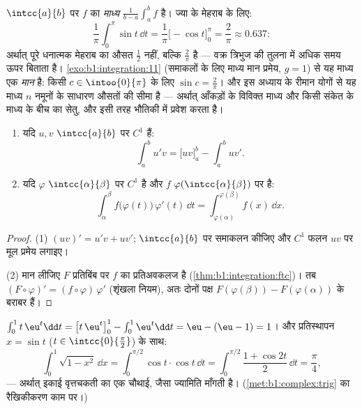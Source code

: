 \begin{example}[औसत मान]\label{ex:b1:integration:average}
$\intcc{a}{b}$ पर  $f$ का \emph{माध्य} $\frac{1}{b-a}\int_a^b f$ है।
ज्या के मेहराब के लिए:
\[
\frac{1}{\pi}\int_0^\pi \sin t\,\dd t
= \frac{1}{\pi}\bigl[-\cos t\bigr]_0^\pi = \frac{2}{\pi}
\approx 0.637 :
\]
अर्थात् पूरे धनात्मक मेहराब का औसत $\frac12$ नहीं, बल्कि $\frac2\pi$ है ---
वक्र त्रिभुज की तुलना में अधिक समय ऊपर बिताता है।
\cref{exo:b1:integration:11} (समाकलों के लिए माध्य मान प्रमेय, $g = 1$) से
यह माध्य एक \emph{मान} है: किसी $c \in \intoo{0}{\pi}$ के लिए $\sin c =
\frac2\pi$। और इस अध्याय के रीमान योगों से यह माध्य $n$ नमूनों के साधारण
औसतों की सीमा है --- अर्थात् आँकड़ों के विविक्त माध्य और किसी संकेत के 
माध्य के बीच का सेतु, और इसी तरह  भौतिकी में प्रवेश करता है।
\end{example}

\begin{theorem}[खंडशः समाकलन; प्रतिस्थापन]\label{thm:b1:integration:parts}
\begin{enumerate}
  \item यदि $u, v$ $\intcc{a}{b}$ पर $C^1$ हैं:
        \[
        \int_a^b u'v = \bigl[uv\bigr]_a^b - \int_a^b uv' .
        \]
  \item यदि $\varphi$ $\intcc{\alpha}{\beta}$ पर $C^1$ है और $f$
  $\varphi(\intcc{\alpha}{\beta})$ पर  है:
        \[
        \int_{\alpha}^{\beta} f\bigl(\varphi(t)\bigr)\,\varphi'(t)\,
        \dd t = \int_{\varphi(\alpha)}^{\varphi(\beta)} f(x)\, \dd x .
        \]
\end{enumerate}
\end{theorem}

\begin{proof}
(1) $(uv)' = u'v + uv'$; $\intcc{a}{b}$ पर समाकलन कीजिए और $C^1$ फलन $uv$ पर
मूल प्रमेय लगाइए।

(2) मान लीजिए $F$ प्रतिबिंब  पर $f$ का प्रतिअवकलज है
(\cref{thm:b1:integration:ftc})। तब $(F \circ \varphi)' = (f \circ
\varphi)\,\varphi'$ (शृंखला नियम), अतः दोनों पक्ष $F(\varphi(\beta)) -
F(\varphi(\alpha))$ के बराबर हैं।
\end{proof}

\begin{example}\label{ex:b1:integration:parts}
$\int_0^1 t\,\eu^t \dd t = \bigl[t\,\eu^t\bigr]_0^1 - \int_0^1 \eu^t\dd t =
\eu - (\eu - 1) = 1$। और प्रतिस्थापन $x = \sin t$ ($t \in
\intcc{0}{\frac\pi2}$) के साथ:
\[
\int_0^1 \sqrt{1 - x^2}\, \dd x
= \int_0^{\pi/2} \cos t \cdot \cos t \, \dd t
= \int_0^{\pi/2} \frac{1 + \cos 2t}{2}\, \dd t = \frac\pi4 ,
\]
--- अर्थात् इकाई वृत्तचकती का एक चौथाई, जैसा ज्यामिति माँगती है।
(\cref{met:b1:complex:trig} का रैखिकीकरण काम पर।)
\end{example}

